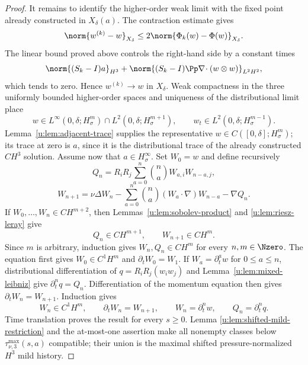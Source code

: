 \begin{proof}
It remains to identify the higher-order weak limit with the fixed point already
constructed in \(X_\delta(a)\).  The contraction estimate gives
\[
 \norm{w^{(k)}-w}_{X_\delta}
 \le2\norm{\Phi_k(w)-\Phi(w)}_{X_\delta}.
\]
The linear bound proved above controls the right-hand side by a constant times
\[
 \norm{(S_k-I)a}_{H^3}
 +\norm{(S_k-I)\Pp\nabla\!\cdot(w\otimes w)}_{L^2H^2},
\]
which tends to zero.  Hence \(w^{(k)}\to w\) in \(X_\delta\).  Weak
compactness in the three uniformly bounded higher-order spaces and uniqueness
of the distributional limit place
\[
 w\in L^\infty(0,\delta;H^m_\sigma)\cap L^2(0,\delta;H^{m+1}_\sigma),
 \qquad w_t\in L^2(0,\delta;H^{m-1}_\sigma).
\]
Lemma~\ref{u:lem:adjacent-trace} supplies the representative
\(w\in C([0,\delta];H^m_\sigma)\); its trace at zero is \(a\), since it is
the distributional trace of the already constructed \(C H^3\) solution.
Assume now that \(a\in H^\infty_\sigma\).  Set \(W_0=w\) and define
recursively
\[
 Q_n=R_iR_j\sum_{a=0}^n\binom naW_{a,i}W_{n-a,j},
\]
\[
 W_{n+1}=\nu\Delta W_n
 -\sum_{a=0}^n\binom na(W_a\cdot\nabla)W_{n-a}-\nabla Q_n.
\]
If \(W_0,\ldots,W_n\in C H^{m+2}\), then
Lemmas~\ref{u:lem:sobolev-product} and \ref{u:lem:riesz-leray} give
\[
 Q_n\in C H^{m+1},
 \qquad
 W_{n+1}\in C H^m.
\]
Since \(m\) is arbitrary, induction gives \(W_n,Q_n\in C H^m\) for every
\(n,m\in\Nzero\).  The equation first gives
\(W_0\in C^1H^m\) and \(\partial_tW_0=W_1\).  If
\(W_a=\partial_t^aw\) for \(0\le a\le n\), distributional differentiation
of \(q=R_iR_j(w_iw_j)\) and Lemma~\ref{u:lem:mixed-leibniz} give
\(\partial_t^nq=Q_n\).  Differentiation of the momentum equation then gives
\(\partial_tW_n=W_{n+1}\).  Induction gives
\[
 W_n\in C^1H^m,
 \qquad
 \partial_tW_n=W_{n+1},
 \qquad
 W_n=\partial_t^nw,
 \qquad
 Q_n=\partial_t^nq.
\]
Time translation proves the result for every \(s\ge0\).  Lemma
\ref{u:lem:shifted-mild-restriction} and the at-most-one assertion make all
nonempty classes below \(\tau_{\nu,3}^{\max}(s,a)\) compatible; their union
is the maximal shifted pressure-normalized \(H^3\) mild history.
\end{proof}
